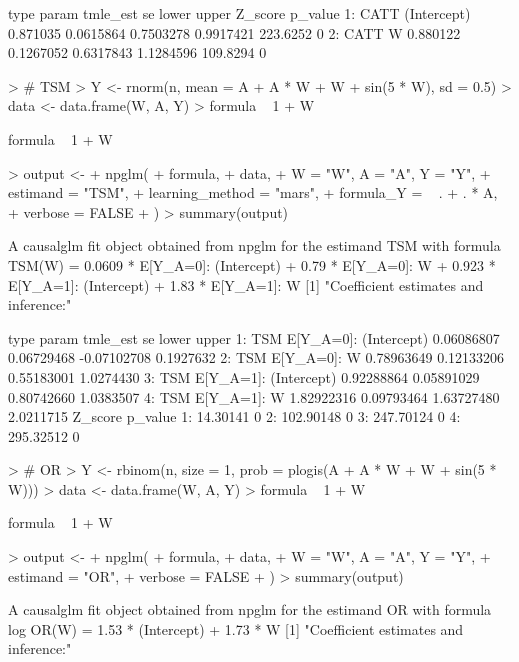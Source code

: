 \documentclass{article}
\begin{document}
\begin{Schunk}
\begin{Soutput}
   type       param tmle_est        se     lower     upper  Z_score p_value
1: CATT (Intercept) 0.871035 0.0615864 0.7503278 0.9917421 223.6252       0
2: CATT           W 0.880122 0.1267052 0.6317843 1.1284596 109.8294       0
\end{Soutput}
\begin{Sinput}
> # TSM
> Y <- rnorm(n, mean = A + A * W + W + sin(5 * W), sd = 0.5)
> data <- data.frame(W, A, Y)
> formula ~ 1 + W
\end{Sinput}
\begin{Soutput}
formula ~ 1 + W
\end{Soutput}
\begin{Sinput}
> output <-
+   npglm(
+     formula,
+     data,
+     W = "W", A = "A", Y = "Y",
+     estimand = "TSM",
+     learning_method = "mars",
+     formula_Y = ~ . + . * A,
+     verbose = FALSE
+   )
> summary(output)
\end{Sinput}
\begin{Soutput}
A causalglm fit object obtained from npglm for the estimand TSM with formula 
TSM(W) = 0.0609 * E[Y_{A=0}]: (Intercept) + 0.79 * E[Y_{A=0}]: W + 0.923 * E[Y_{A=1}]: (Intercept) + 1.83 * E[Y_{A=1}]: W
[1] "Coefficient estimates and inference:"

   type                   param   tmle_est         se       lower     upper
1:  TSM E[Y_{A=0}]: (Intercept) 0.06086807 0.06729468 -0.07102708 0.1927632
2:  TSM           E[Y_{A=0}]: W 0.78963649 0.12133206  0.55183001 1.0274430
3:  TSM E[Y_{A=1}]: (Intercept) 0.92288864 0.05891029  0.80742660 1.0383507
4:  TSM           E[Y_{A=1}]: W 1.82922316 0.09793464  1.63727480 2.0211715
     Z_score p_value
1:  14.30141       0
2: 102.90148       0
3: 247.70124       0
4: 295.32512       0
\end{Soutput}
\begin{Sinput}
> # OR
> Y <- rbinom(n, size = 1, prob = plogis(A + A * W + W + sin(5 * W)))
> data <- data.frame(W, A, Y)
> formula ~ 1 + W
\end{Sinput}
\begin{Soutput}
formula ~ 1 + W
\end{Soutput}
\begin{Sinput}
> output <-
+   npglm(
+     formula,
+     data,
+     W = "W", A = "A", Y = "Y",
+     estimand = "OR",
+     verbose = FALSE
+   )
> summary(output)
\end{Sinput}
\begin{Soutput}
A causalglm fit object obtained from npglm for the estimand OR with formula 
log OR(W) = 1.53 * (Intercept) + 1.73 * W
[1] "Coefficient estimates and inference:"


\end{Soutput}
\end{Schunk}
\end{document}
